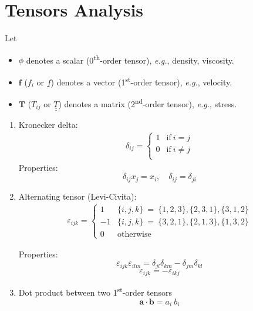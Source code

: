 \documentclass[a4paper]{article}
\begin{document}
\section{Tensors Analysis}
Let 
\begin{itemize}
    \item $\phi$ denotes a scalar (0\textsuperscript{th}-order tensor), \textit{e.g.}, density, viscosity.
    \item $\mathbf{f}$ ($f_i$ or $\underline{f}$) denotes a vector (1\textsuperscript{st}-order tensor), \textit{e.g.}, velocity.
    \item $\mathbf{T}$ ($T_{ij}$ or $\underline{\underline{T}}$) denotes a matrix (2\textsuperscript{nd}-order tensor), \textit{e.g.}, stress.
\end{itemize}


\begin{multicols}{2}
\begin{enumerate}

    \item Kronecker delta: 
    \begin{align*}
    \delta_{ij} = 
        \begin{cases}
            1 & \text{if} \ i=j \\
            0 & \text{if} \ i\neq j \\
        \end{cases}
    \end{align*}
    Properties:
    \[\delta_{ij}x_{j} = x_{i}, \quad \delta_{ij}=\delta_{ji}\]
    
    \item Alternating tensor (Levi-Civita):
    \begin{align*}
    \varepsilon_{ijk} = 
        \begin{cases}
            1 & \{i,j,k\} \ =\ \{1,2,3\}, \{2,3,1\}, \{3,1,2\} \\
            -1 & \{i,j,k\} \ =\ \{3,2,1\}, \{2,1,3\}, \{1,3,2\} \\
            0 & \text{otherwise}
        \end{cases}
    \end{align*}
    
    Properties:
    \[\varepsilon_{ijk}\varepsilon_{il m}=\delta_{jl}\delta_{km}-\delta_{jm}\delta_{kl}\]
    \[\varepsilon_{ijk} = -\varepsilon_{ikj}\]
    
    \item Dot product between two 1\textsuperscript{st}-order tensors
    \[\mathbf{a} \cdot \mathbf{b} = a_{i} \ b_{i}\]
    

\end{enumerate}
\end{multicols}
\end{document}
